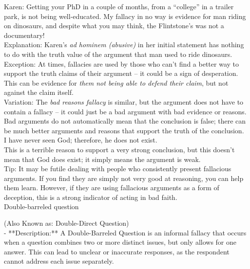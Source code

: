 \documentclass[a4paper,12pt,single,pdftex]{scrbook}
\begin{document}
    
      Karen:  Getting your PhD in a couple of months, from a “college” in a trailer park, is not being well-educated.  My fallacy in no way is evidence for man riding on dinosaurs, and despite what you may think, the Flintstone’s was not a documentary!
    \\

    
      Explanation: Karen’s {\it ad hominem (abusive)} in her initial statement has nothing to do with the truth value of the argument that man used to ride dinosaurs.
    \\

    
      Exception: At times, fallacies are used by those who can’t find a better way to support the truth claims of their argument -- it could be a sign of desperation.  This can be evidence for {\it them not being able to defend their claim}, but not against the claim itself.
    \\

    
      Variation: The {\it bad reasons fallacy} is similar, but the argument does not have to contain a fallacy -- it could just be a bad argument with bad evidence or reasons.  Bad arguments do not automatically mean that the conclusion is false; there can be much better arguments and reasons that support the truth of the conclusion.
    \\

    
      I have never seen God; therefore, he does not exist.
    \\

    
      This is a terrible reason to support a very strong conclusion, but this doesn’t mean that God does exist; it simply means the argument is weak.
    \\

    
      Tip: It may be futile dealing with people who consistently present fallacious arguments. If you find they are simply not very good at reasoning, you can help them learn. However, if they are using fallacious arguments as a form of deception, this is a strong indicator of acting in bad faith.
    \\

  

Double-barreled question
    
      (Also Known as: Double-Direct Question)
    \\

  
    
      - **Description:** A Double-Barreled Question is an informal fallacy that occurs when a question combines two or more distinct issues, but only allows for one answer. This can lead to unclear or inaccurate responses, as the respondent cannot address each issue separately.
    \\
\end{document}
